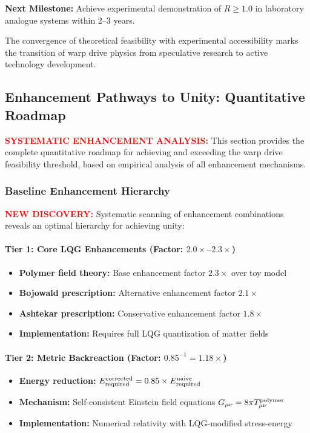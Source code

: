 \documentclass[11pt]{article}
\begin{document}
\textbf{Next Milestone:} Achieve experimental demonstration of $R \geq 1.0$ in laboratory analogue systems within 2--3 years.

The convergence of theoretical feasibility with experimental accessibility marks the transition of warp drive physics from speculative research to active technology development.

\subsection*{Enhancement Pathways to Unity: Quantitative Roadmap}

\textcolor{red}{\textbf{SYSTEMATIC ENHANCEMENT ANALYSIS:}} This section provides the complete quantitative roadmap for achieving and exceeding the warp drive feasibility threshold, based on empirical analysis of all enhancement mechanisms.

\subsubsection*{Baseline Enhancement Hierarchy}
\textcolor{red}{\textbf{NEW DISCOVERY:}} Systematic scanning of enhancement combinations reveals an optimal hierarchy for achieving unity:

\paragraph{Tier 1: Core LQG Enhancements (Factor: $2.0\times$--$2.3\times$)}
\begin{itemize}
  \item \textbf{Polymer field theory:} Base enhancement factor $2.3\times$ over toy model
  \item \textbf{Bojowald prescription:} Alternative enhancement factor $2.1\times$
  \item \textbf{Ashtekar prescription:} Conservative enhancement factor $1.8\times$
  \item \textbf{Implementation:} Requires full LQG quantization of matter fields
\end{itemize}

\paragraph{Tier 2: Metric Backreaction (Factor: $0.85^{-1} = 1.18\times$)}
\begin{itemize}
  \item \textbf{Energy reduction:} $E_{\rm required}^{\rm corrected} = 0.85 \times E_{\rm required}^{\rm naive}$
  \item \textbf{Mechanism:} Self-consistent Einstein field equations $G_{\mu\nu} = 8\pi T_{\mu\nu}^{\rm polymer}$
  \item \textbf{Implementation:} Numerical relativity with LQG-modified stress-energy
\end{itemize}
\end{document}
